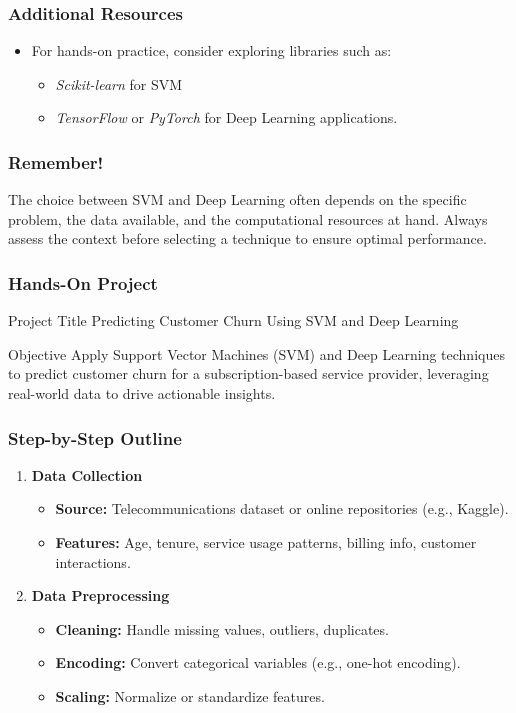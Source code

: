 \documentclass[aspectratio=169]{beamer}
\begin{document}
\begin{frame}[fragile]
    \frametitle{Additional Resources}
    \begin{itemize}
        \item For hands-on practice, consider exploring libraries such as:
        \begin{itemize}
            \item \textit{Scikit-learn} for SVM
            \item \textit{TensorFlow} or \textit{PyTorch} for Deep Learning applications.
        \end{itemize}
    \end{itemize}
\end{frame}

\begin{frame}[fragile]
    \frametitle{Remember!}
    The choice between SVM and Deep Learning often depends on the specific problem, the data available, and the computational resources at hand. Always assess the context before selecting a technique to ensure optimal performance.
\end{frame}

\begin{frame}[fragile]
    \frametitle{Hands-On Project}
    \begin{block}{Project Title}
        Predicting Customer Churn Using SVM and Deep Learning
    \end{block}
    
    \begin{block}{Objective}
        Apply Support Vector Machines (SVM) and Deep Learning techniques to predict customer churn for a subscription-based service provider, leveraging real-world data to drive actionable insights.
    \end{block}
\end{frame}

\begin{frame}[fragile]
    \frametitle{Step-by-Step Outline}
    \begin{enumerate}
        \item \textbf{Data Collection}
        \begin{itemize}
            \item \textbf{Source:} Telecommunications dataset or online repositories (e.g., Kaggle).
            \item \textbf{Features:} Age, tenure, service usage patterns, billing info, customer interactions.
        \end{itemize}
        
        \item \textbf{Data Preprocessing}
        \begin{itemize}
            \item \textbf{Cleaning:} Handle missing values, outliers, duplicates.
            \item \textbf{Encoding:} Convert categorical variables (e.g., one-hot encoding).
            \item \textbf{Scaling:} Normalize or standardize features.
        \end{itemize}
    \end{enumerate}
\end{frame}
\end{document}
